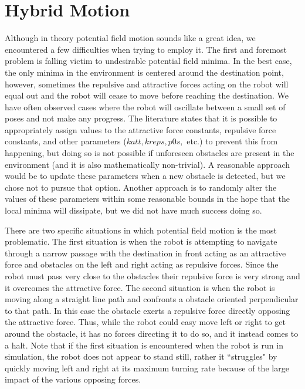 \documentclass[11pt]{article}
\begin{document}
\section{Hybrid Motion}
\label{sec:robotmotion}

Although in theory potential field motion sounds like a great idea, we encountered a few difficulties when trying to employ it. The first and foremost problem is falling victim to undesirable potential field minima. In the best case, the only minima in the environment is centered around the destination point, however, sometimes the repulsive and attractive forces acting on the robot will equal out and the robot will cease to move before reaching the destination. We have often observed cases where the robot will oscillate between a small set of poses and not make any progress. The literature states that it is possible to appropriately assign values to the attractive force constants, repulsive force constants, and other parameters ($katt, kreps, p0s,$ etc.) to prevent this from happening, but doing so is not possible if unforeseen obstacles are present in the environment (and it is also mathematically non-trivial). A reasonable approach would be to update these parameters when a new obstacle is detected, but we chose not to pursue that option. Another approach is to randomly alter the values of these parameters within some reasonable bounds in the hope that the local minima will dissipate, but we did not have much success doing so.

There are two specific situations in which potential field motion is the most problematic. The first situation is when the robot is attempting to navigate through a narrow passage with the destination in front acting as an attractive force and obstacles on the left and right acting as repulsive forces. Since the robot must pass very close to the obstacles their repulsive force is very strong and it overcomes the attractive force. The second situation is when the robot is moving along a straight line path and confronts a obstacle oriented perpendicular to that path. In this case the obstacle exerts a repulsive force directly opposing the attractive force. Thus, while the robot could easy move left or right to get around the obstacle, it has no forces directing it to do so, and it instead comes to a halt. Note that if the first situation is encountered when the robot is run in simulation, the robot does not appear to stand still, rather it ``struggles" by quickly moving left and right at its maximum turning rate because of the large impact of the various opposing forces.
\end{document}
